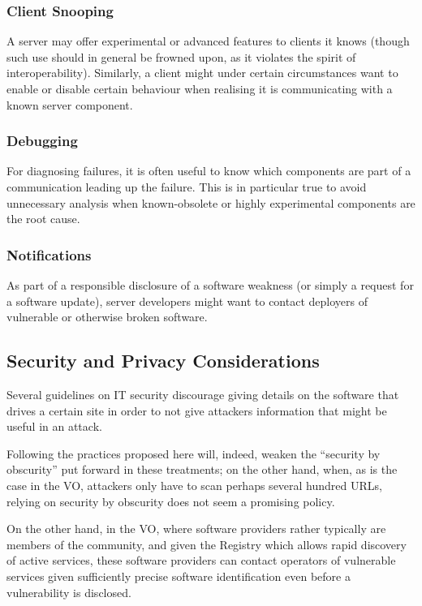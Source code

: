 \documentclass[11pt,a4paper]{ivoa}
\begin{document}
\subsubsection{Client Snooping}

A server may offer experimental or advanced features to clients it knows
(though such use should in general be frowned upon, as it violates the
spirit of interoperability).  Similarly, a client might under certain
circumstances want to enable or disable certain behaviour when realising
it is communicating with a known server component.

\subsubsection{Debugging}

For diagnosing failures, it is often useful to know which components are
part of a communication leading up the failure.  This is in particular
true to avoid unnecessary analysis when known-obsolete or highly
experimental components are the root cause.

\subsubsection{Notifications}

As part of a responsible disclosure of a software weakness (or simply a
request for a software update), server developers might want to contact
deployers of vulnerable or otherwise broken software.

\subsection{Security and Privacy Considerations}

Several guidelines on IT security discourage giving details on the
software that drives a certain site in order to not give attackers
information that might be useful in an attack.

Following the practices proposed here will, indeed, weaken the
``security by obscurity'' put forward in these treatments; on the other
hand, when, as is the case in the VO, attackers only have 
to scan perhaps several hundred URLs,
relying on security by obscurity does not seem a promising policy.

On the other
hand, in the VO, where software providers rather typically are members
of the community, and given the Registry which allows rapid discovery of
active services, these software providers can contact
operators of vulnerable services given sufficiently precise software
identification even before a vulnerability is disclosed.
\end{document}
